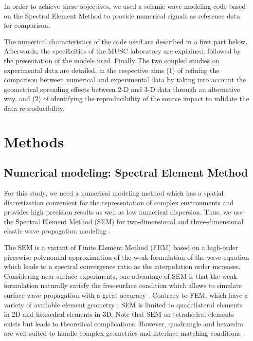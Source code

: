 \documentclass[manuscript,revised]{geophysics}
\newcommand{\twod}{2-D }
\newcommand{\thrd}{3-D }
\begin{document}
\noindent In order to achieve these objectives, we used a seismic wave modeling code based on the Spectral Element Method \citep{Komatitsch_SEM_1998,Komatitsch_ISM_1999,Komatitsch_SEM_2005,Festa_PML_2005} to provide numerical signals as reference data for comparison. 


\noindent The numerical characteristics of the code used are described in a first part below. Afterwards, the specificities of the MUSC laboratory are explained, followed by the presentation of the models used. Finally The two coupled studies on experimental data are detailed, in the respective aims (1) of refining the comparison between numerical and experimental data by taking into account the geometrical spreading effects between \twod and \thrd data through an alternative way, and (2) of identifying the reproducibility of the source impact to validate the data reproducibility.


\section{Methods}

\subsection{Numerical modeling: Spectral Element Method}

\noindent For this study, we need a numerical modeling method which has a spatial discretization convenient for the representation of complex environments and provides high precision results as well as low numerical dispersion. Thus, we use the Spectral Element Method (SEM) for two-dimensional and three-dimensional elastic wave propagation modeling \citep{Komatitsch_SEM_1998,Komatitsch_ISM_1999,Komatitsch_SEM_2005,Festa_PML_2005}. 

\noindent The SEM is a variant of Finite Element Method (FEM) \citep{Lysmer_FEM_1972,Seron_FEM_1990,Hulbert_FEM_1990,Tromp_SEM_2008} based on a high-order piecewise polynomial approximation of the weak formulation of the wave equation which leads to a spectral convergence ratio as the interpolation order increases. Considering near-surface experiments, one advantage of SEM is that the weak formulation naturally satisfy the free-surface condition which allows to simulate surface wave propagation with a great accuracy \citep{komatitsch1998spectral,komatitsch1999spectral,Komatitsch_SEM_2005}. Contrary to FEM, which have a variety of available element geometry \citep{dhatt1984finite}, SEM is limited to quadrilateral elements in 2D and hexaedral elements in 3D. Note that SEM on tetrahedral elements exists \citep{komatitsch2001wave} but leads to theoretical complications. However, quadrangle and hexaedra are well suited to handle complex geometries and interface matching conditions \citep{Cristini_SEM_2012}. 
\end{document}
